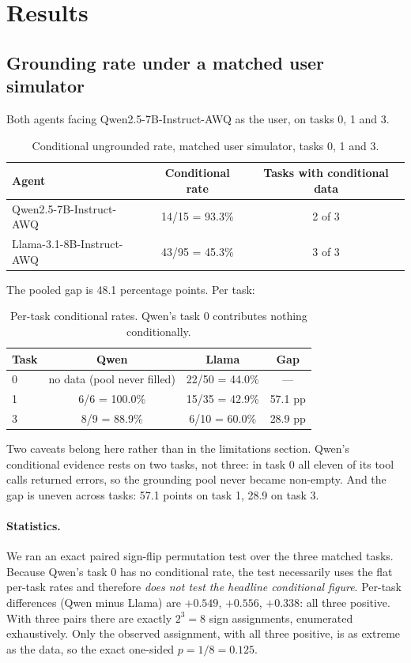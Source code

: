 \documentclass{article}
\begin{document}
\section{Results}
\label{sec:results}

\subsection{Grounding rate under a matched user simulator}

Both agents facing Qwen2.5-7B-Instruct-AWQ as the user, on tasks 0, 1 and 3.

\begin{table}[h]
\centering
\caption{Conditional ungrounded rate, matched user simulator, tasks 0, 1 and 3.}
\begin{tabular}{lcc}
\toprule
Agent & Conditional rate & Tasks with conditional data \\
\midrule
Qwen2.5-7B-Instruct-AWQ & 14/15 = 93.3\% & 2 of 3 \\
Llama-3.1-8B-Instruct-AWQ & 43/95 = 45.3\% & 3 of 3 \\
\bottomrule
\end{tabular}
\end{table}

The pooled gap is 48.1 percentage points. Per task:

\begin{table}[h]
\centering
\caption{Per-task conditional rates. Qwen's task 0 contributes nothing conditionally.}
\begin{tabular}{lccc}
\toprule
Task & Qwen & Llama & Gap \\
\midrule
0 & no data (pool never filled) & 22/50 = 44.0\% & --- \\
1 & 6/6 = 100.0\% & 15/35 = 42.9\% & 57.1 pp \\
3 & 8/9 = 88.9\% & 6/10 = 60.0\% & 28.9 pp \\
\bottomrule
\end{tabular}
\end{table}

Two caveats belong here rather than in the limitations section. Qwen's conditional evidence rests on two tasks, not three: in task 0 all eleven of its tool calls returned errors, so the grounding pool never became non-empty. And the gap is uneven across tasks: 57.1 points on task 1, 28.9 on task 3.

\paragraph{Statistics.} We ran an exact paired sign-flip permutation test over the three matched tasks. Because Qwen's task 0 has no conditional rate, the test necessarily uses the flat per-task rates and therefore \emph{does not test the headline conditional figure}. Per-task differences (Qwen minus Llama) are $+0.549$, $+0.556$, $+0.338$: all three positive. With three pairs there are exactly $2^3 = 8$ sign assignments, enumerated exhaustively. Only the observed assignment, with all three positive, is as extreme as the data, so the exact one-sided $p = 1/8 = 0.125$.
\end{document}
